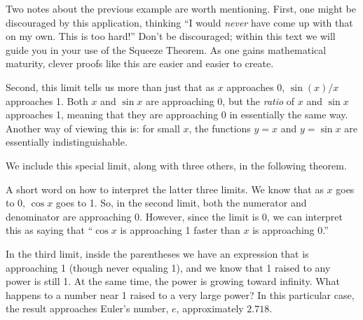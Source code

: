 Two notes about the previous example are worth mentioning. First, one might be discouraged by this application, thinking ``I would \textit{never} have come up with that on my own. This is too hard!'' Don't be discouraged; within this text we will guide you in your use of the Squeeze Theorem. As one gains mathematical maturity, clever proofs like this are easier and easier to create.

Second, this limit tells us more than just that as $x$ app\-roaches 0, $\sin(x)/x$ approaches 1. Both $x$ and $\sin x$ are approaching 0, but the \textit{ratio} of $x$ and $\sin x$ approaches 1, meaning that they are approaching 0 in essentially the same way. Another way of viewing this is: for small $x$, the functions $y=x$ and $y=\sin x$ are essentially indistinguishable.\bigskip

We include this special limit, along with three others, in the following theorem.


A short word on how to interpret the latter three limits. We know that as $x$ goes to 0, $\cos x$ goes to 1. So, in the second limit, both the numerator and denominator are approaching 0. However, since the limit is 0, we can interpret this as saying that ``$\cos x$ is approaching 1 faster than $x$ is approaching 0.''

In the third limit, inside the parentheses we have an expression that is approaching 1 (though never equaling 1), and we know that 1 raised to any power is still 1. At the same time, the power is growing toward infinity. What happens to a number near 1 raised to a very large power? In this particular case, the result approaches Euler's number, $e$, approximately $2.718.$

